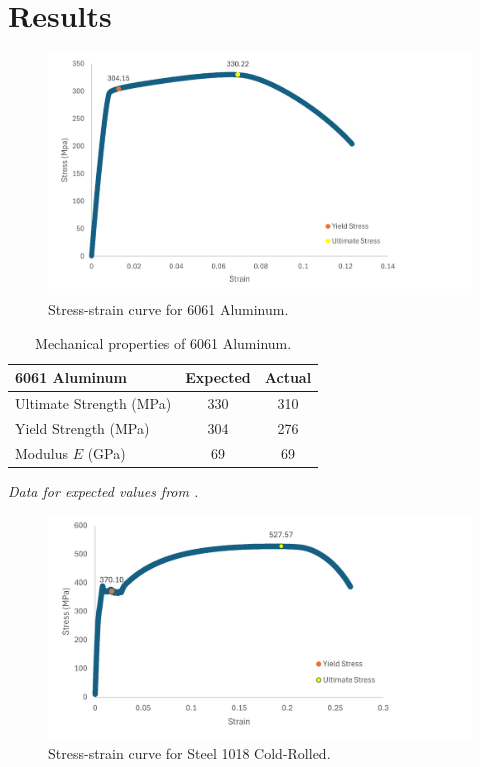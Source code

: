 \documentclass[conf]{new-aiaa} %
\begin{document}
\section{Results}

\begin{figure}[H]
    \centering
    \includegraphics[width=0.7\linewidth]{alxl.png}
    \caption{Stress-strain curve for 6061 Aluminum.}
    \label{fig:aluminum}
\end{figure}

\begin{table}[H]
    \centering
    \renewcommand{\arraystretch}{1.3}
    \begin{tabular}{lcc}
    \toprule
    \textbf{6061 Aluminum} & Expected & Actual \\
    \midrule
    Ultimate Strength (MPa) & 330 & 310 \\ 
    Yield Strength (MPa)    & 304 & 276 \\ 
    Modulus $E$ (GPa)       & 69  & 69 \\ 
    \bottomrule
    \end{tabular}
    \caption{Mechanical properties of 6061 Aluminum.}
    \footnotesize\textit{Data for expected values from \cite{matweb6061}.}
    \label{tab:aluminum}
\end{table}

\begin{figure}[H]
    \centering
    \includegraphics[width=0.7\linewidth]{stxl.png}
    \caption{Stress-strain curve for Steel 1018 Cold-Rolled.}
    \label{fig:steel}
\end{figure}
\end{document}
